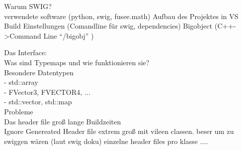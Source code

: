  \label{sec:Umsetzung}


Warum SWIG?\\
verwendete software (python, swig, fusee.math)
Aufbau des Projektes in VS\\
Build Einstellungen (Comandline für swig, dependencies)
Bigobject (C++->Command Line "`/bigobj"' )

Das Interface:\\
	Was sind Typemaps und wie funktionieren sie?\\
	Besondere Datentypen\\
		- std::array\\
		- FVector3, FVECTOR4, ...\\
		- std::vector, std::map\\
		
	Probleme\\
	Das header file groß lange Buildzeiten\\
	Ignore Genereated
	Header file extrem groß  mit vileen classen. beser um zu swiggen wären (laut swig doku) einzelne header files pro klasse
....
